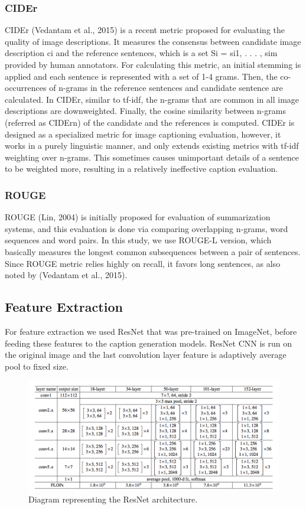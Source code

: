 \documentclass[a4paper]{article}
\begin{document}
\subsubsection{CIDEr}
CIDEr (Vedantam et al., 2015) is a recent metric
proposed for evaluating the quality of image
descriptions. It measures the consensus between
candidate image description ci and the reference
sentences, which is a set Si = {si1, . . . , sim} provided
by human annotators. For calculating this
metric, an initial stemming is applied and each
sentence is represented with a set of 1-4 grams.
Then, the co-occurrences of n-grams in the reference
sentences and candidate sentence are calculated.
In CIDEr, similar to tf-idf, the n-grams that
are common in all image descriptions are downweighted.
Finally, the cosine similarity between
n-grams (referred as CIDErn) of the candidate and
the references is computed.
CIDEr is designed as a specialized metric for
image captioning evaluation, however, it works in
a purely linguistic manner, and only extends existing
metrics with tf-idf weighting over n-grams.
This sometimes causes unimportant details of a
sentence to be weighted more, resulting in a relatively
ineffective caption evaluation.
\subsubsection{ROUGE}
ROUGE (Lin, 2004) is initially proposed for evaluation
of summarization systems, and this evaluation
is done via comparing overlapping n-grams,
word sequences and word pairs. In this study, we
use ROUGE-L version, which basically measures
the longest common subsequences between a pair
of sentences. Since ROUGE metric relies highly
on recall, it favors long sentences, as also noted
by (Vedantam et al., 2015).

\subsection{Feature	Extraction}
For feature extraction we used ResNet\cite{DBLP:journals/corr/HeZRS15} that was pre-trained on ImageNet\cite{deng2009imagenet}, before feeding these features to the caption generation models. ResNet CNN is run on the original image and the last convolution layer feature is adaptively average pool to fixed size.

\begin{figure}[H]
\centering
\includegraphics[width=1\textwidth]{resnet.png}
\caption{\label{fig:arch}Diagram representing the ResNet architecture.}
\end{figure}
\end{document}
